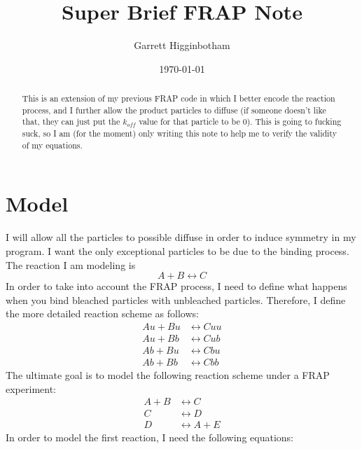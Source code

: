 \documentclass[aps, prl, preprint]{revtex4-1}
\begin{document}
\title{Super Brief FRAP Note}
\author{Garrett Higginbotham}
\date{\today}

\begin{abstract}

This is an extension of my previous FRAP code in which I better encode the reaction process, and I further allow the product particles to diffuse (if someone doesn't like that, they can just put the $k_{off}$ value for that particle to be $0$). This is going to fucking suck, so I am (for the moment) only writing this note to help me to verify the validity of my equations.

\end{abstract}

\maketitle

\section{Model}

I will allow all the particles to possible diffuse in order to induce symmetry in my program. I want the only exceptional particles to be due to the binding process. The reaction I am modeling is
\begin{equation}
A + B \leftrightarrow C
\end{equation}
In order to take into account the FRAP process, I need to define what happens when you bind bleached particles with unbleached particles. Therefore, I define the more detailed reaction scheme as follows:
\begin{align*}
Au + Bu &\leftrightarrow Cuu\\
Au + Bb &\leftrightarrow Cub\\
Ab + Bu &\leftrightarrow Cbu\\
Ab + Bb &\leftrightarrow Cbb
\end{align*}
The ultimate goal is to model the following reaction scheme under a FRAP experiment:
\begin{align*}
A + B &\leftrightarrow C\\
C &\leftrightarrow D\\
D &\leftrightarrow A + E
\end{align*}
In order to model the first reaction, I need the following equations:
\end{document}
